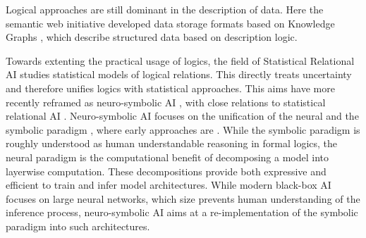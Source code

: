 Logical approaches are still dominant in the description of data.
Here the semantic web initiative developed data storage formats based on Knowledge Graphs \cite{antoniou_semantic_2012,hogan_knowledge_2021}, which describe structured data based on description logic.

Towards extenting the practical usage of logics, the field of Statistical Relational AI \cite{nickel_review_2016,getoor_introduction_2019} studies statistical models of logical relations.
This directly treats uncertainty and therefore unifies logics with statistical approaches.
This aims have more recently reframed as neuro-symbolic AI \cite{hochreiter_toward_2022, sarker_neuro-symbolic_2022}, with close relations to statistical relational AI \cite{marra_statistical_2024}.
Neuro-symbolic AI focuses on the unification of the neural and the symbolic paradigm \cite{garcez_neural-symbolic_2019}, where early approaches are \cite{towell_knowledge-based_1994,avila_garcez_connectionist_1999}.
While the symbolic paradigm is roughly understood as human understandable reasoning in formal logics, the neural paradigm is the computational benefit of decomposing a model into layerwise computation.
These decompositions provide both expressive and efficient to train and infer model architectures.
While modern black-box AI focuses on large neural networks, which size prevents human understanding of the inference process, neuro-symbolic AI aims at a re-implementation of the symbolic paradigm into such architectures.



